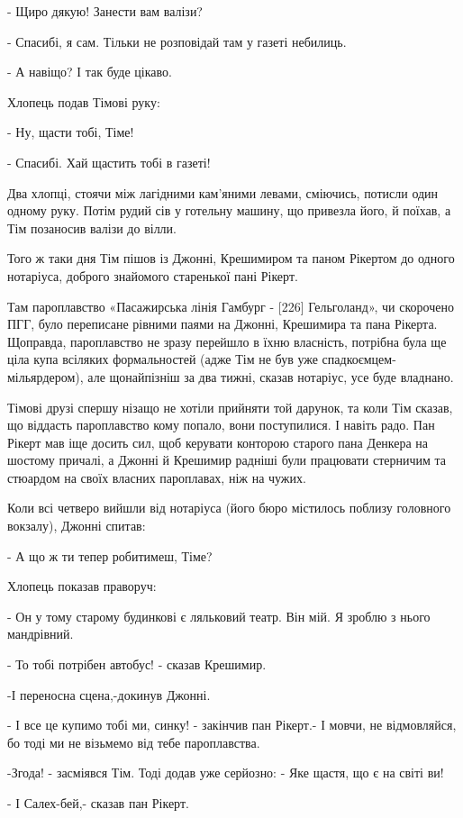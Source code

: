 - Щиро дякую! Занести вам валізи?

- Спасибі, я сам. Тільки не розповідай там у газеті небилиць.

- А навіщо? І так буде цікаво.

Хлопець подав Тімові руку:

- Ну, щасти тобі, Тіме!

- Спасибі. Хай щастить тобі в газеті!

Два хлопці, стоячи між лагідними кам'яними левами, сміючись, потисли один одному руку. Потім рудий сів у готельну машину, що привезла його, й поїхав, а Тім позаносив валізи до вілли.

Того ж таки дня Тім пішов із Джонні, Крешимиром та паном Рікертом до одного нотаріуса, доброго знайомого старенької пані Рікерт.

Там пароплавство «Пасажирська лінія Гамбург - [226] Гельголанд», чи скорочено ПГГ, було переписане рівними паями на Джонні, Крешимира та пана Рікерта. Щоправда, пароплавство не зразу перейшло в їхню власність, потрібна була ще ціла купа всіляких формальностей (адже Тім не був уже спадкоємцем-мільярдером), але щонайпізніш за два тижні, сказав нотаріус, усе буде владнано.

Тімові друзі спершу нізащо не хотіли прийняти той дарунок, та коли Тім сказав, що віддасть пароплавство кому попало, вони поступилися. І навіть радо. Пан Рікерт мав іще досить сил, щоб керувати конторою старого пана Денкера на шостому причалі, а Джонні й Крешимир радніші були працювати стерничим та стюардом на своїх власних пароплавах, ніж на чужих.

Коли всі четверо вийшли від нотаріуса (його бюро містилось поблизу головного вокзалу), Джонні спитав:

- А що ж ти тепер робитимеш, Тіме?

Хлопець показав праворуч:

- Он у тому старому будинкові є ляльковий театр. Він мій. Я зроблю з нього мандрівний.

- То тобі потрібен автобус! - сказав Крешимир.

-І переносна сцена,-докинув Джонні.

- І все це купимо тобі ми, синку! - закінчив пан Рікерт.- І мовчи, не відмовляйся, бо тоді ми не візьмемо від тебе пароплавства.

-Згода! - засміявся Тім. Тоді додав уже серйозно: - Яке щастя, що є на світі ви!

- І Салех-бей,- сказав пан Рікерт.

